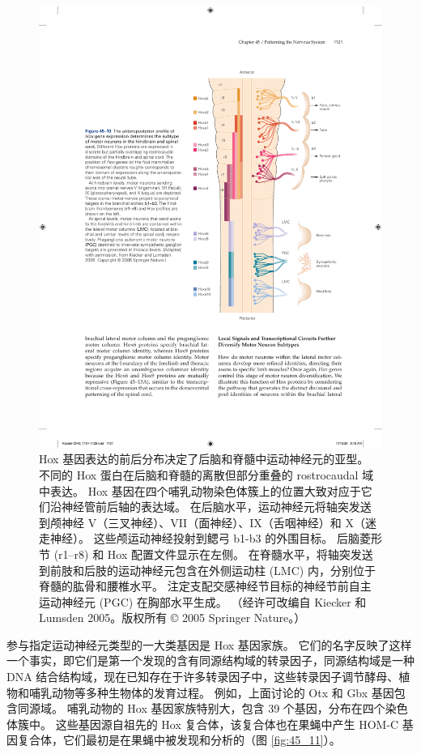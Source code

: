 \begin{figure}[htbp]
	\centering
	\includegraphics[width=0.65\linewidth]{chap45/fig_45_10}
	\caption{Hox 基因表达的前后分布决定了后脑和脊髓中运动神经元的亚型。 不同的 Hox 蛋白在后脑和脊髓的离散但部分重叠的 rostrocaudal 域中表达。 Hox 基因在四个哺乳动物染色体簇上的位置大致对应于它们沿神经管前后轴的表达域。 在后脑水平，运动神经元将轴突发送到颅神经 V（三叉神经）、VII（面神经）、IX（舌咽神经）和 X（迷走神经）。 这些颅运动神经投射到鳃弓 b1-b3 的外围目标。 后脑菱形节 (r1–r8) 和 Hox 配置文件显示在左侧。 在脊髓水平，将轴突发送到前肢和后肢的运动神经元包含在外侧运动柱 (LMC) 内，分别位于脊髓的肱骨和腰椎水平。 注定支配交感神经节目标的神经节前自主运动神经元 (PGC) 在胸部水平生成。 （经许可改编自 Kiecker 和 Lumsden 2005。版权所有 © 2005 Springer Nature。）}
	\label{fig:45_10}
\end{figure}

参与指定运动神经元类型的一大类基因是 Hox 基因家族。 它们的名字反映了这样一个事实，即它们是第一个发现的含有同源结构域的转录因子，同源结构域是一种 DNA 结合结构域，现在已知存在于许多转录因子中，这些转录因子调节酵母、植物和哺乳动物等多种生物体的发育过程。 例如，上面讨论的 Otx 和 Gbx 基因包含同源域。 哺乳动物的 Hox 基因家族特别大，包含 39 个基因，分布在四个染色体簇中。 
这些基因源自祖先的 Hox 复合体，该复合体也在果蝇中产生 HOM-C 基因复合体，它们最初是在果蝇中被发现和分析的（图 \ref{fig:45_11}）。

